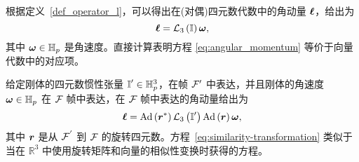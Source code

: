 根据定义~\ref{def_operator_l}，可以得出在(对偶)四元数代数中的角动量 $\boldsymbol{\ell}$，给出为
\begin{equation}
\boldsymbol{\ell}=\mathcal{L}_{3}\left(\boldsymbol{\mathbb{I}}\right)\boldsymbol{\omega},\label{eq:angular_momentum}
\end{equation}
其中 $\boldsymbol{\omega}\in\mathbb{H}_{p}$ 是角速度。直接计算表明方程 \eqref{eq:angular_momentum} 等价于向量代数中的对应项。

给定刚体的四元数惯性张量 $\boldsymbol{\mathbb{I}}'\in\mathbb{H}_{p}^{3}$，在帧 $\mathcal{F}_{}'$ 中表达，并且刚体的角速度 $\boldsymbol{\omega}\in\mathbb{H}_{p}$ 在 $\mathcal{F}_{}$ 帧中表达，在 $\mathcal{F}_{}$ 帧中表达的角动量给出为
\begin{equation}
\boldsymbol{\ell}=\mathrm{Ad}\left(\boldsymbol{r}^{*}\right)\mathcal{L}_{3}\left(\boldsymbol{\mathbb{I}}'\right)\mathrm{Ad}\left(\boldsymbol{r}\right)\boldsymbol{\omega},\label{eq:similarity-transformation}
\end{equation}
其中 $\boldsymbol{r}$ 是从 $\mathcal{F}_{}^{'}$ 到 $\mathcal{F}_{}$ 的旋转四元数。方程~\eqref{eq:similarity-transformation} 类似于当在 $\mathbb{R}^{3}$ 中使用旋转矩阵和向量的相似性变换时获得的方程。
